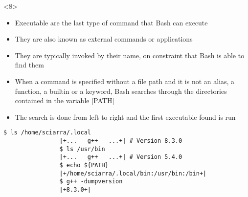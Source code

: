 \begin{frame}
\begin{overlayarea}{\textwidth}{0.7\textheight}
\begin{onlyenv}
        \end{onlyenv}
        \begin{onlyenv}<8>
            \begin{itemize}
                \item Executable are the last type of command that Bash can execute
                \item They are also known as external commands or applications
                \item They are typically invoked by their name, on constraint that Bash is able to find them
                \item When a command is specified without a file path and it is \alert{not an alias, a function, a builtin or a keyword}, Bash searches through the directories contained in the variable \bash|PATH|
                \item The search is done from left to right and the first executable found is run
            \end{itemize}
            \begin{lstlisting}[style=MyBash]
                $ ls /home/sciarra/.local
                |+...   g++   ...+| # Version 8.3.0
                $ ls /usr/bin
                |+...   g++   ...+| # Version 5.4.0
                $ echo ${PATH}
                |+/home/sciarra/.local/bin:/usr/bin:/bin+|
                $ g++ -dumpversion
                |+8.3.0+|
            \end{lstlisting}
        \end{onlyenv}
    \end{overlayarea}
\end{frame}
